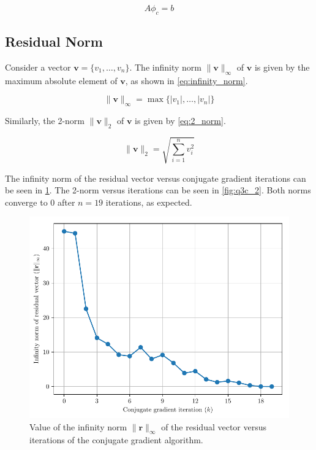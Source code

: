 \documentclass[a4paper,titlepage]{article}
\begin{document}
	\begin{equation} \label{eq:fd}
		A\phi_c = b
	\end{equation}
	
	\subsection{Residual Norm}
	
	Consider a vector $\textbf{v} = \{v_1, \ldots, v_n\}$. The infinity norm $\|\textbf{v}\|_\infty$ of $\textbf{v}$ is given by the maximum absolute element of $\textbf{v}$, as shown in \cref{eq:infinity_norm}.
	
	\begin{equation} \label{eq:infinity_norm}
		\|\textbf{v}\|_\infty = \max\{|v_1|, \ldots, |v_n|\}
	\end{equation}
	
	Similarly, the 2-norm $\|\textbf{v}\|_2$ of $\textbf{v}$ is given by \cref{eq:2_norm}.
	
	\begin{equation} \label{eq:2_norm}
		\|\textbf{v}\|_2 = \sqrt{\sum_{i = 1}^{n} v_i^2}
	\end{equation}
	
	The infinity norm of the residual vector versus conjugate gradient iterations can be seen in \cref{fig:q3c_infinity}. The 2-norm versus iterations can be seen in \cref{fig:q3c_2}. Both norms converge to 0 after $n = 19$ iterations, as expected.
	
	\begin{figure}[!htb]
		\centering
		\includegraphics[width=\columnwidth]{plots/q3c_infinity.pdf}
		\caption
		{Value of the infinity norm $\|\textbf{r}\|_\infty$ of the residual vector versus iterations of the conjugate gradient algorithm.}
		\label{fig:q3c_infinity}
	\end{figure}
	
\end{document}
